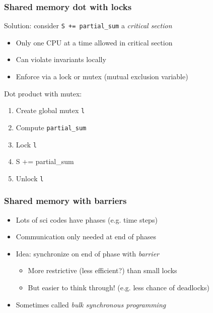 \documentclass{beamer}
\begin{document}
\begin{frame}
  \frametitle{Shared memory dot with locks}

  Solution: consider {\tt S += partial\_sum} a {\em critical section}
  \begin{itemize}
  \item Only one CPU at a time allowed in critical section
  \item Can violate invariants locally
  \item Enforce via a lock or mutex (mutual exclusion variable)
  \end{itemize}
  
  \vspace{5mm}
  Dot product with mutex:
  \begin{enumerate}
  \item Create global mutex {\tt l}
  \item Compute {\tt partial\_sum}
  \item Lock {\tt l}
  \item {S += partial\_sum}
  \item Unlock {\tt l}
  \end{enumerate}

\end{frame}


\begin{frame}
  \frametitle{Shared memory with barriers}
  
  \begin{itemize}
  \item Lots of sci codes have phases (e.g. time steps)
  \item Communication only needed at end of phases
  \item Idea: synchronize on end of phase with {\em barrier}
    \begin{itemize}
    \item More restrictive (less efficient?) than small locks
    \item But easier to think through!  (e.g. less chance of deadlocks)
    \end{itemize}
  \item Sometimes called {\em bulk synchronous programming}
  \end{itemize}

\end{frame}
\end{document}
